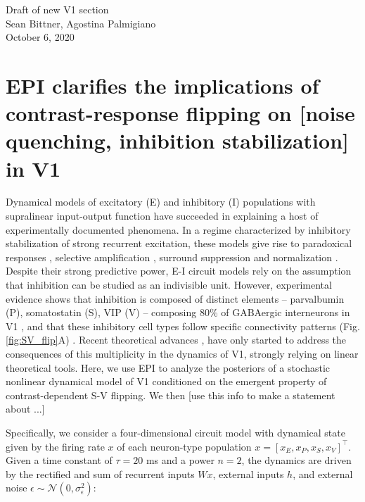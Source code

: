 \documentclass[11pt]{article}
\begin{document}
\medskip                        %

\thispagestyle{plain}
\begin{center}                  %
{\Large Draft of new V1 section} \\
Sean Bittner, Agostina Palmigiano \\
October 6, 2020 \\
\end{center}

\section{EPI clarifies the implications of contrast-response flipping on [noise quenching, inhibition stabilization] in V1}\label{results_V1}
Dynamical models of excitatory (E) and inhibitory (I) populations with supralinear input-output function have succeeded in explaining a host of experimentally documented phenomena.
In a regime characterized by inhibitory stabilization of strong recurrent excitation, these models give rise to paradoxical responses \cite{tsodyks1997paradoxical}, selective amplification  \cite{murphy2009balanced}, surround suppression \cite{ozeki2009inhibitory} and normalization \cite{rubin2015stabilized}. 
Despite their strong predictive power, E-I circuit models rely on the assumption that inhibition can be studied as an indivisible unit. 
However, experimental evidence shows that inhibition is composed of distinct elements -- parvalbumin (P), somatostatin (S), VIP (V) --
composing 80\% of GABAergic interneurons in V1 \cite{markram2004interneurons, rudy2011three, tremblay2016}, and that these inhibitory cell types follow specific connectivity patterns (Fig. \ref{fig:SV_flip}A) \cite{pfeffer2013inhibition}.
Recent theoretical advances \cite{litwin2016inhibitory, GarciaDelMolino2017, Chen2019},  have only started to address the consequences of this multiplicity in the dynamics of V1, strongly relying on linear theoretical tools. 
Here, we use EPI to analyze the posteriors of a stochastic nonlinear dynamical model of V1 conditioned on the emergent property of contrast-dependent S-V flipping.
We then [use this info to make a statement about ...]

Specifically, we consider a four-dimensional circuit model with dynamical state given by the firing rate $x$ of each neuron-type population $x = \left[x_E, x_P , x_S, x_V \right]^\top$. Given a time constant of $\tau = 20$ ms and a power $n = 2$, the dynamics are driven by the rectified and sum of recurrent inputs $Wx$, external inputs $h$, and external noise $\epsilon \sim \mathcal{N}(0, \sigma_{\epsilon}^2)$:
\end{document}
